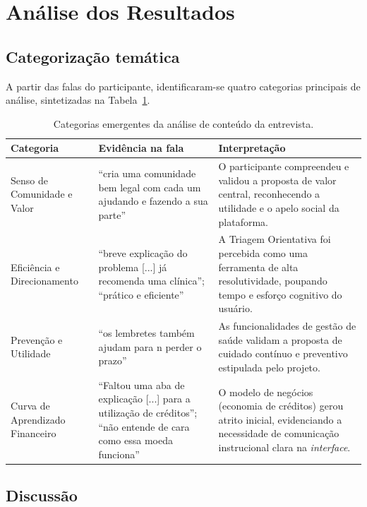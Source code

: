 \documentclass[12pt,a4paper]{article}
\begin{document}
\section{Análise dos Resultados}

\subsection{Categorização temática}

A partir das falas do participante, identificaram-se quatro categorias principais de análise, sintetizadas na Tabela~\ref{tab:categorias}.

\begin{table}[h!]
\centering
\small
\begin{tabular}{@{}>{\raggedright\arraybackslash}p{3.2cm}>{\raggedright\arraybackslash}p{4.8cm}>{\raggedright\arraybackslash}p{5.5cm}@{}}
\toprule
\textbf{Categoria} & \textbf{Evidência na fala} & \textbf{Interpretação} \\
\midrule
Senso de Comunidade e Valor &
\enquote{cria uma comunidade bem legal com cada um ajudando e fazendo a sua parte} &
O participante compreendeu e validou a proposta de valor central, reconhecendo a utilidade e o apelo social da plataforma. \\
\addlinespace
Eficiência e Direcionamento &
\enquote{breve explicação do problema [...] já recomenda uma clínica}; \enquote{prático e eficiente} &
A Triagem Orientativa foi percebida como uma ferramenta de alta resolutividade, poupando tempo e esforço cognitivo do usuário. \\
\addlinespace
Prevenção e Utilidade &
\enquote{os lembretes também ajudam para n perder o prazo} &
As funcionalidades de gestão de saúde validam a proposta de cuidado contínuo e preventivo estipulada pelo projeto. \\
\addlinespace
Curva de Aprendizado Financeiro &
\enquote{Faltou uma aba de explicação [...] para a utilização de créditos}; \enquote{não entende de cara como essa moeda funciona} &
O modelo de negócios (economia de créditos) gerou atrito inicial, evidenciando a necessidade de comunicação instrucional clara na \textit{interface}. \\
\bottomrule
\end{tabular}
\caption{Categorias emergentes da análise de conteúdo da entrevista.}
\label{tab:categorias}
\end{table}

\subsection{Discussão}
\end{document}
